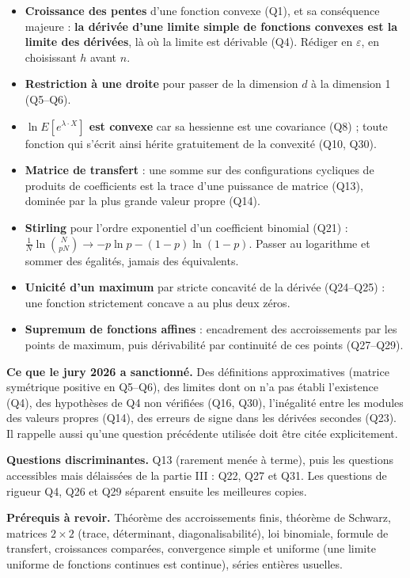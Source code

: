 \documentclass[11pt,a4paper]{article}
\providecommand{\tightlist}{\setlength{\itemsep}{0pt}\setlength{\parskip}{0pt}}
\begin{document}
\begin{itemize}
\tightlist
\item
  \textbf{Croissance des pentes} d'une fonction convexe (Q1), et sa conséquence majeure : \textbf{la dérivée d'une limite simple de fonctions convexes est la limite des dérivées}, là où la limite est dérivable (Q4). Rédiger en \(\varepsilon\), en choisissant \(h\) avant \(n\).
\item
  \textbf{Restriction à une droite} pour passer de la dimension \(d\) à la dimension 1 (Q5--Q6).
\item
  \textbf{\(\ln E[e^{\lambda\cdot X}]\) est convexe} car sa hessienne est une covariance (Q8) ; toute fonction qui s'écrit ainsi hérite gratuitement de la convexité (Q10, Q30).
\item
  \textbf{Matrice de transfert} : une somme sur des configurations cycliques de produits de coefficients est la trace d'une puissance de matrice (Q13), dominée par la plus grande valeur propre (Q14).
\item
  \textbf{Stirling} pour l'ordre exponentiel d'un coefficient binomial (Q21) : \(\frac1N\ln\binom N{pN}\to-p\ln p-(1-p)\ln(1-p)\). Passer au logarithme et sommer des égalités, jamais des équivalents.
\item
  \textbf{Unicité d'un maximum} par stricte concavité de la dérivée (Q24--Q25) : une fonction strictement concave a au plus deux zéros.
\item
  \textbf{Supremum de fonctions affines} : encadrement des accroissements par les points de maximum, puis dérivabilité par continuité de ces points (Q27--Q29).
\end{itemize}

\textbf{Ce que le jury 2026 a sanctionné.} Des définitions approximatives (matrice symétrique positive en Q5--Q6), des limites dont on n'a pas établi l'existence (Q4), des hypothèses de Q4 non vérifiées (Q16, Q30), l'inégalité entre les modules des valeurs propres (Q14), des erreurs de signe dans les dérivées secondes (Q23). Il rappelle aussi qu'une question précédente utilisée doit être citée explicitement.

\textbf{Questions discriminantes.} Q13 (rarement menée à terme), puis les questions accessibles mais délaissées de la partie III : Q22, Q27 et Q31. Les questions de rigueur Q4, Q26 et Q29 séparent ensuite les meilleures copies.

\textbf{Prérequis à revoir.} Théorème des accroissements finis, théorème de Schwarz, matrices \(2\times2\) (trace, déterminant, diagonalisabilité), loi binomiale, formule de transfert, croissances comparées, convergence simple et uniforme (une limite uniforme de fonctions continues est continue), séries entières usuelles.
\end{document}
